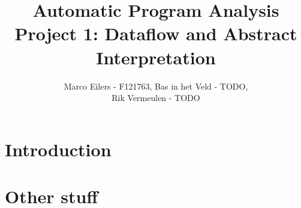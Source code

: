 \documentclass[a4paper,11pt]{article}
\begin{document}
\title{Automatic Program Analysis\\Project 1: Dataflow and Abstract Interpretation}
\author{Marco Eilers - F121763, Bas in het Veld - TODO,\\Rik Vermeulen - TODO}

\maketitle

\section{Introduction}

\section{Other stuff}
\end{document}

